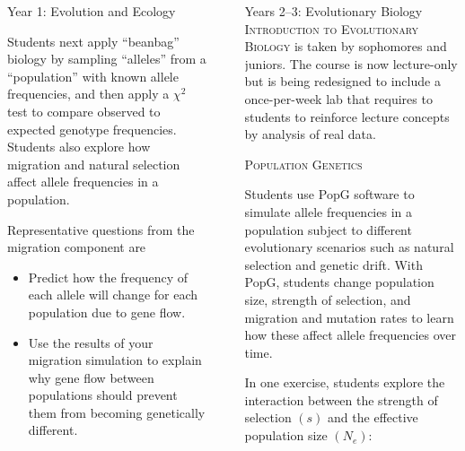 \documentclass[final,hyperref={pdfpagelabels=false}]{beamer}
\newcommand{\whitespace}{\vspace{0.5\baselineskip}}
\newlength{\sepwid}
\newlength{\onecolwid}
\begin{document}
\begin{frame}[t]
\begin{columns}[t]
\begin{column}{\onecolwid}
\begin{block}{Year 1: Evolution and Ecology}
			\whitespace
			
			Students next apply “beanbag” biology \citep{jungck2010mathematical} by sampling “alleles” from a “population” with known allele frequencies, and then apply a $\chi^2$ test to compare observed to expected genotype frequencies. Students also explore how migration and natural selection affect allele frequencies in a population.
			
			\whitespace
			
			Representative questions from the migration component are
			
			\begin{itemize}\justifying
				\item Predict how the frequency of each allele will change for each population due to gene  flow.
				
				\item Use the results of your migration simulation to explain why gene flow between populations should prevent them from becoming genetically different.
			\end{itemize}
			
    	\end{block}
	\end{column}

	\begin{column}{\sepwid}
	\end{column}

	\begin{column}{\onecolwid}
    	\begin{block}{Years 2–3: Evolutionary Biology}
       		\textsc{Introduction to Evolutionary Biology} is taken by sophomores and juniors. The course is now lecture-only but is being redesigned to include a once-per-week lab that requires to students to reinforce lecture concepts by analysis of real data.
       		
       		\whitespace
       		
       		\textsc{Population Genetics} 
       		
       		Students use PopG software \citep{Felsenstein2016:popg} to simulate allele frequencies in a population subject to different evolutionary scenarios such as natural selection and genetic drift. With PopG, students change population size, strength of selection, and migration and mutation rates to learn how these affect allele frequencies over time.
       		
       		\whitespace
       		
       		In one exercise, students explore the interaction between the strength of selection $\left(s\right)$ and the effective population size $\left(N_e\right)$:
       		

\end{block}
\end{column}
\end{columns}
\end{frame}
\end{document}
